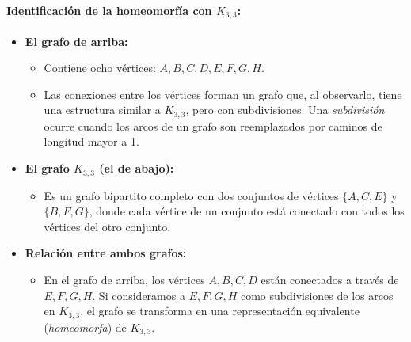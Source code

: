 \documentclass{article}
\begin{document}
\begin{center}
\end{center}

\paragraph{Identificación de la homeomorfía con \( K_{3,3} \):}
\begin{itemize}
    \item \textbf{El grafo de arriba:}
    \begin{itemize}
        \item Contiene ocho vértices: \( A, B, C, D, E, F, G, H \).
        \item Las conexiones entre los vértices forman un grafo que, al observarlo, tiene una estructura similar a \( K_{3,3} \), pero con subdivisiones. Una \textit{subdivisión} ocurre cuando los arcos de un grafo son reemplazados por caminos de longitud mayor a 1.
    \end{itemize}
    \item \textbf{El grafo \( K_{3,3} \) (el de abajo):}
    \begin{itemize}
        \item Es un grafo bipartito completo con dos conjuntos de vértices \( \{A, C, E\} \) y \( \{B, F, G\} \), donde cada vértice de un conjunto está conectado con todos los vértices del otro conjunto.
    \end{itemize}
    \item \textbf{Relación entre ambos grafos:}
    \begin{itemize}
        \item En el grafo de arriba, los vértices \( A, B, C, D \) están conectados a través de \( E, F, G, H \). Si consideramos a \( E, F, G, H \) como subdivisiones de los arcos en \( K_{3,3} \), el grafo se transforma en una representación equivalente (\textit{homeomorfa}) de \( K_{3,3} \).
    \end{itemize}
\end{itemize}
\end{document}
